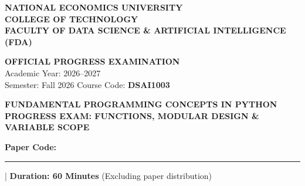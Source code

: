 \documentclass[11pt,a4paper]{article}
\begin{document}

\noindent
\begin{minipage}[t]{0.64\textwidth}
  \raggedright\small
  \textbf{NATIONAL ECONOMICS UNIVERSITY}\\
  \textbf{COLLEGE OF TECHNOLOGY}\\
  \textbf{FACULTY OF DATA SCIENCE \& ARTIFICIAL INTELLIGENCE (FDA)}
\end{minipage}%
\hfill
\begin{minipage}[t]{0.34\textwidth}
  \raggedleft\footnotesize
  \textbf{OFFICIAL PROGRESS EXAMINATION}\\
  Academic Year: 2026--2027\\
  Semester: Fall 2026 \quad Course Code: \textbf{DSAI1003}
\end{minipage}

\vspace{0.1em}

\begin{center}
  {\Large\bfseries\color{primaryblue} FUNDAMENTAL PROGRAMMING CONCEPTS IN PYTHON}\\[0.05em]
  {\normalsize\bfseries PROGRESS EXAM: FUNCTIONS, MODULAR DESIGN \& VARIABLE SCOPE}\\[0.05em]
  {\normalsize\textbf{Paper Code:} \rule{1.6cm}{0.4pt} \quad | \quad \textbf{Duration: 60 Minutes} (Excluding paper distribution)}
\end{center}

\vspace{0.05em}
\end{document}
